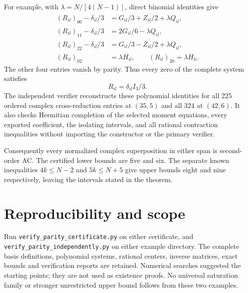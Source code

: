 \documentclass[11pt]{article}
\begin{document}
For example, with $\lambda=N/[4(N-1)]$, direct binomial identities give
\[
\begin{aligned}
 (R_{il})_{00}-\delta_{il}/3
   &=\overline{G_{il}/3+Z_{il}/2+\lambda Q_{il}},\\
 (R_{il})_{11}-\delta_{il}/3
   &=2\overline{G_{il}/6-\lambda Q_{il}},\\
 (R_{il})_{22}-\delta_{il}/3
   &=\overline{G_{il}/3-Z_{il}/2+\lambda Q_{il}},\\
 (R_{il})_{02}&=\lambda\overline{H_{il}},\qquad
 (R_{il})_{20}=\lambda H_{li}.
\end{aligned}
\]
The other four entries vanish by parity. Thus every zero of the complete
system satisfies
\[
 R_{il}=\delta_{il}I_3/3.
\]
The independent verifier reconstructs these polynomial identities for
all 225 ordered complex cross-reduction entries at $(35,5)$ and all 324
at $(42,6)$. It also checks Hermitian completion of the selected moment
equations, every exported coefficient, the isolating intervals, and all
rational contraction inequalities without importing the constructor or
the primary verifier.

Consequently every normalized complex superposition in either span is
second-order AC. The certified lower bounds are five and six. The separate
known inequalities $4k\le N-2$ and $5k\le N+5$ give upper bounds eight and
nine respectively, leaving the intervals stated in the theorem.

\section{Reproducibility and scope}
Run \texttt{verify\_parity\_certificate.py} on either certificate, and
\texttt{verify\_parity\_independently.py} on either example directory.
The complete basis definitions, polynomial systems, rational centers,
inverse matrices, exact bounds and verification reports are retained.
Numerical searches suggested the starting points; they are not used as
existence proofs. No universal saturation family or stronger unrestricted
upper bound follows from these two examples.
\end{document}

